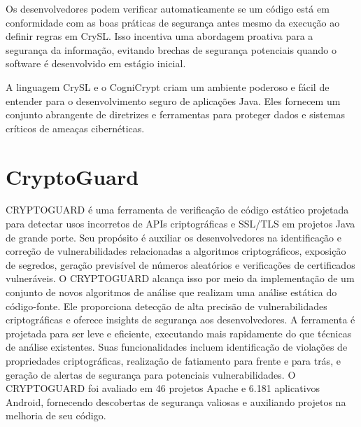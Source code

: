 Os desenvolvedores podem verificar automaticamente se um código está em conformidade com as boas práticas de segurança antes mesmo da execução ao definir regras em CrySL. Isso incentiva uma abordagem proativa para a segurança da informação, evitando brechas de segurança potenciais quando o software é desenvolvido em estágio inicial.

A linguagem CrySL e o CogniCrypt criam um ambiente poderoso e fácil de entender para o desenvolvimento seguro de aplicações Java. Eles fornecem um conjunto abrangente de diretrizes e ferramentas para proteger dados e sistemas críticos de ameaças cibernéticas.

\section{CryptoGuard} %

CRYPTOGUARD é uma ferramenta de verificação de código estático projetada para detectar usos incorretos de APIs criptográficas e SSL/TLS em projetos Java de grande porte. Seu propósito é auxiliar os desenvolvedores na identificação e correção de vulnerabilidades relacionadas a algoritmos criptográficos, exposição de segredos, geração previsível de números aleatórios e verificações de certificados vulneráveis. O CRYPTOGUARD alcança isso por meio da implementação de um conjunto de novos algoritmos de análise que realizam uma análise estática do código-fonte. Ele proporciona detecção de alta precisão de vulnerabilidades criptográficas e oferece insights de segurança aos desenvolvedores. A ferramenta é projetada para ser leve e eficiente, executando mais rapidamente do que técnicas de análise existentes. Suas funcionalidades incluem identificação de violações de propriedades criptográficas, realização de fatiamento para frente e para trás, e geração de alertas de segurança para potenciais vulnerabilidades. O CRYPTOGUARD foi avaliado em 46 projetos Apache e 6.181 aplicativos Android, fornecendo descobertas de segurança valiosas e auxiliando projetos na melhoria de seu código.



